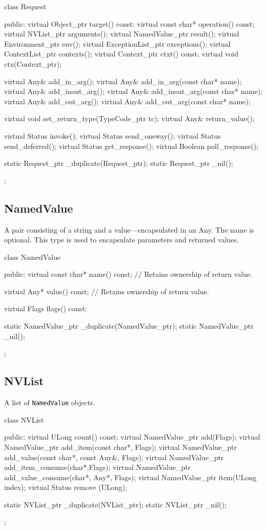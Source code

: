 \documentclass[11pt,twoside,a4paper]{book}
\newcommand{\type}[1]{\texttt{#1}}
\begin{document}
\begin{cxxlisting}
class Request {
public:
  virtual Object_ptr        target() const;
  virtual const char*       operation() const;
  virtual NVList_ptr        arguments();
  virtual NamedValue_ptr    result();
  virtual Environment_ptr   env();
  virtual ExceptionList_ptr exceptions();
  virtual ContextList_ptr   contexts();
  virtual Context_ptr       ctxt() const;
  virtual void              ctx(Context_ptr);

  virtual Any& add_in_arg();
  virtual Any& add_in_arg(const char* name);
  virtual Any& add_inout_arg();
  virtual Any& add_inout_arg(const char* name);
  virtual Any& add_out_arg();
  virtual Any& add_out_arg(const char* name);

  virtual void set_return_type(TypeCode_ptr tc);
  virtual Any& return_value();

  virtual Status  invoke();
  virtual Status  send_oneway();
  virtual Status  send_deferred();
  virtual Status  get_response();
  virtual Boolean poll_response();

  static Request_ptr _duplicate(Request_ptr);
  static Request_ptr _nil();
};
\end{cxxlisting}


\subsection{NamedValue}

A pair consisting of a string and a value---encapsulated in an Any.
The name is optional. This type is used to encapsulate parameters and
returned values.

\begin{cxxlisting}
class NamedValue {
public:
  virtual const char* name() const;
  // Retains ownership of return value.

  virtual Any* value() const;
  // Retains ownership of return value.

  virtual Flags flags() const;

  static NamedValue_ptr _duplicate(NamedValue_ptr);
  static NamedValue_ptr _nil();
};
\end{cxxlisting}


\subsection{NVList}

A list of \type{NamedValue} objects.

\begin{cxxlisting}
class NVList {
public:
  virtual ULong count() const;
  virtual NamedValue_ptr add(Flags);
  virtual NamedValue_ptr add_item(const char*, Flags);
  virtual NamedValue_ptr add_value(const char*, const Any&, Flags);
  virtual NamedValue_ptr add_item_consume(char*,Flags);
  virtual NamedValue_ptr add_value_consume(char*, Any*, Flags);
  virtual NamedValue_ptr item(ULong index);
  virtual Status remove (ULong);

  static NVList_ptr _duplicate(NVList_ptr);
  static NVList_ptr _nil();
};
\end{cxxlisting}
\end{document}
